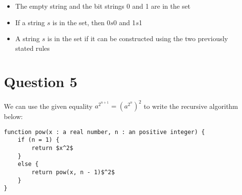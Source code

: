 \documentclass[11pt]{article}
\begin{document}
\begin{itemize}
    \item The empty string and the bit strings 0 and 1 are in the set
    \item If a string $s$ is in the set, then 0$s$0 and 1$s$1
    \item A string $s$ is in the set if it can be constructed using the two previously stated rules
\end{itemize}

\section*{Question 5}
We can use the given equality $a^{2^{n+1}} = (a^{2^{n}})^2$ to write the recursive algorithm below:

\begin{lstlisting}[mathescape=true]
function pow(x : a real number, n : an positive integer) {
    if (n = 1) {
        return $x^2$
    }
    else {
        return pow(x, n - 1)$^2$
    }
}
\end{lstlisting}
\end{document}
